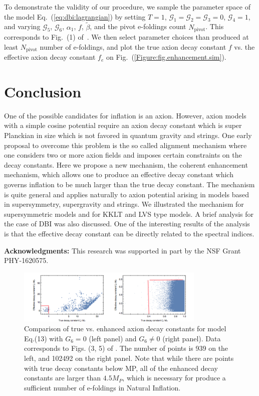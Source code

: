 \documentclass[12pt]{article}
\begin{document}
To demonstrate the validity of our procedure, we sample the parameter space of the model Eq.~(\ref{eq:dbi:lagrangian}) by setting $T = 1$, $\mathcal{G}_1 = \mathcal{G}_2 = \mathcal{G}_3 = 0$, $\mathcal{G}_4 = 1$, and varying $\mathcal{G}_5$, $\mathcal{G}_6$, $\alpha_1$, $f$, $\tilde\beta$, and the pivot e-foldings count $N_\text{pivot}$.
This corresponds to Fig.~(1) of~\cite{Nath:2018xxe}.
We then select parameter choices than produced at least $N_\text{pivot}$ number of e-foldings, and plot the true axion decay constant $f$ vs. the effective axion decay constant $f_e$ on Fig.~(\ref{Figure:fig.enhancement.sim}).


\section{Conclusion \label{sec:Conclusion}}
One of the possible candidates for inflation is an axion. However, axion models with a simple cosine potential
require an axion decay constant which is super Planckian in size which is not favored in quantum gravity and strings.
One early proposal to overcome this problem is the so called alignment mechanism where one considers two or more
axion fields and imposes certain constraints on the decay constants. Here we propose a new mechanism, the coherent
enhancement mechanism, which allows one to produce an effective decay constant which governs inflation to be much
larger than the true decay constant. The mechanism is quite general and applies naturally to axion potential arising
in models based in supersymmetry, supergravity and strings. We illustrated the mechanism for supersymmetric
models and for KKLT and LVS type models. A brief analysis for the case of DBI was also discussed.
One of the interesting results of the analysis is that the effective decay constant can be directly related to the spectral indices.

\textbf{Acknowledgments:}
This research was supported in part by the NSF Grant PHY-1620575.

\clearpage

\begin{figure}
  \centering
  \includegraphics[width=0.8\textwidth]{figs/figsusy.png}
  \caption{ Comparison of true vs. enhanced axion decay constants for model Eq.(13) with $G_6 = 0$ (left panel) and
    $G_6 \neq 0$ (right panel). Data corresponds to Figs. (3, 5) of \cite{Nath:2017ihp}.
    The number of points is 939 on the left, and 102492 on the right panel.
    Note that while there are points with true decay constants below
    MP, all of the enhanced decay constants are larger than $4.5 M_P$, which is
    necessary for produce a sufficient number of e-foldings in Natural Inflation.}
  \label{figsusy}
\end{figure}
\end{document}
